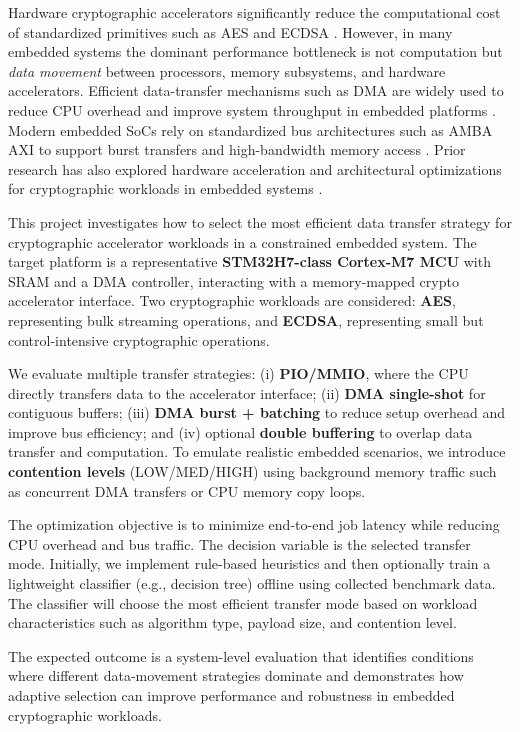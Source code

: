 \documentclass[11pt]{article}
\newcommand{\PlaceholderBox}[3]{%
  \begin{tcolorbox}[proposalbox,title={#1}]
    #2
    \vspace{0.2\baselineskip}
    #3
  \end{tcolorbox}%
}
\begin{document}
\PlaceholderBox
  {Abstract}
  {}
  {
Hardware cryptographic accelerators significantly reduce the computational cost of standardized primitives such as AES and ECDSA \cite{NISTFIPS197,NISTFIPS1865}. 
However, in many embedded systems the dominant performance bottleneck is not computation but \emph{data movement} between processors, memory subsystems, and hardware accelerators. 
Efficient data-transfer mechanisms such as DMA are widely used to reduce CPU overhead and improve system throughput in embedded platforms \cite{SilabsAN0013}. 
Modern embedded SoCs rely on standardized bus architectures such as AMBA AXI to support burst transfers and high-bandwidth memory access \cite{ArmAXIIntro}. 
Prior research has also explored hardware acceleration and architectural optimizations for cryptographic workloads in embedded systems \cite{Zhang2021CryptoAccel}.
\vspace{0.5\baselineskip}

This project investigates how to select the most efficient data transfer strategy for cryptographic accelerator workloads in a constrained embedded system. The target platform is a representative \textbf{STM32H7-class Cortex-M7 MCU} with SRAM and a DMA controller, interacting with a memory-mapped crypto accelerator interface. Two cryptographic workloads are considered: \textbf{AES}, representing bulk streaming operations, and \textbf{ECDSA}, representing small but control-intensive cryptographic operations.
\vspace{0.5\baselineskip}

We evaluate multiple transfer strategies: (i) \textbf{PIO/MMIO}, where the CPU directly transfers data to the accelerator interface; (ii) \textbf{DMA single-shot} for contiguous buffers; (iii) \textbf{DMA burst + batching} to reduce setup overhead and improve bus efficiency; and (iv) optional \textbf{double buffering} to overlap data transfer and computation. To emulate realistic embedded scenarios, we introduce \textbf{contention levels} (LOW/MED/HIGH) using background memory traffic such as concurrent DMA transfers or CPU memory copy loops.
\vspace{0.5\baselineskip}

The optimization objective is to minimize end-to-end job latency while reducing CPU overhead and bus traffic. The decision variable is the selected transfer mode. Initially, we implement rule-based heuristics and then optionally train a lightweight classifier (e.g., decision tree) offline using collected benchmark data. The classifier will choose the most efficient transfer mode based on workload characteristics such as algorithm type, payload size, and contention level.

The expected outcome is a system-level evaluation that identifies conditions where different data-movement strategies dominate and demonstrates how adaptive selection can improve performance and robustness in embedded cryptographic workloads.
}
\end{document}
